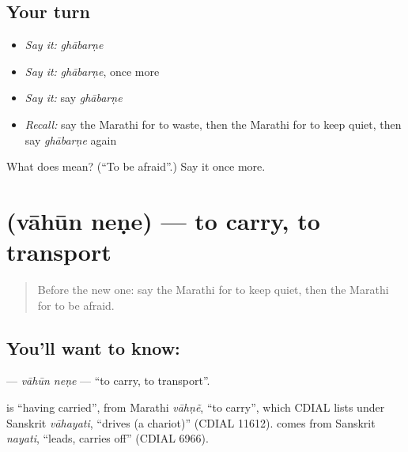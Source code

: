 \subsection*{Your turn}
\begin{itemize}
\raggedright
  \item \emph{Say it:} \emph{ghābarṇe}
  \item \emph{Say it:} \emph{ghābarṇe}, once more
  \item \emph{Say it:} say \emph{ghābarṇe}
  \item \emph{Recall:} say the Marathi for to waste, then the Marathi for to keep quiet, then say \emph{ghābarṇe} again
\end{itemize}

\begin{tcolorbox}[breakable,colback=teal!4,colframe=teal!35!black,title={Before you move on}]
What does  mean? (\textquotedblleft{}To be afraid\textquotedblright{}.) Say it once more.
\end{tcolorbox}
\section[\texorpdfstring{\mr{वाहून} \mr{नेणे} (vāhūn neṇe)}{वाहून नेणे (vāhūn neṇe)}]{  (vāhūn neṇe) — to carry, to transport}

\label{lesson:MR-C166-vahun-nene}



\begin{quote}
Before the new one: say the Marathi for to keep quiet, then the Marathi for to be afraid.
\end{quote}

\subsection*{You'll want to know:  }
\textbf{ } — \emph{vāhūn neṇe} — \textquotedblleft{}to carry, to transport\textquotedblright{}.

\begin{cousinweb}
\textbf{} is \textquotedblleft{}having carried\textquotedblright{}, from Marathi \emph{vāhṇẽ}, \textquotedblleft{}to carry\textquotedblright{}, which CDIAL lists under Sanskrit \emph{vāhayati}, \textquotedblleft{}drives (a chariot)\textquotedblright{} (CDIAL 11612). \textbf{} comes from Sanskrit \emph{nayati}, \textquotedblleft{}leads, carries off\textquotedblright{} (CDIAL 6966).
\end{cousinweb}

